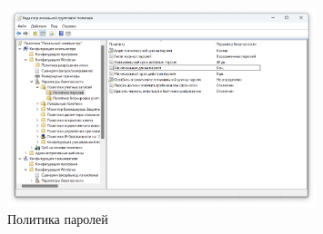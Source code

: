 \documentclass[a4paper, 14pt]{report}
\begin{document}
\begin{enumerate}
\begin{itemize}
\begin{itemize}
                    \end{itemize}
          \end{itemize}
          \begin{figure}[H]
              \centering
              \includegraphics[width=0.8\textwidth]{../images/password_policy.png}
              \caption{Политика паролей}
          \end{figure}
\end{enumerate}
\end{document}
